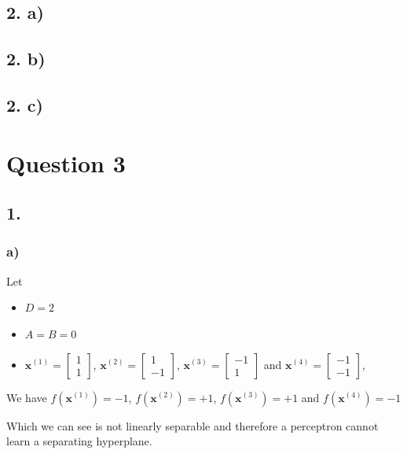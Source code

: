 \documentclass[11pt]{article}
\begin{document}
\subsection{2. a)}
\subsection{2. b)}
\subsection{2. c)}
\pagebreak
\section{Question 3}
\subsection{1.}
\subsubsection{a)}
Let
\begin{itemize}
  \item $D = 2$
  \item $A = B = 0$
  \item $\bm{x}^{(1)} = \begin{bmatrix} 1 \\ 1\end{bmatrix}$, $\bm{x}^{(2)} = \begin{bmatrix} 1 \\ -1\end{bmatrix}$, $\bm{x}^{(3)} = \begin{bmatrix} -1 \\ 1\end{bmatrix}$ and $\bm{x}^{(4)} = \begin{bmatrix} -1 \\ -1\end{bmatrix}$, 
  \end{itemize}
  We have $f ( \bm{x}^{(1)}) = -1$, $f ( \bm{x}^{(2)}) = +1$, $f ( \bm{x}^{(3)}) = +1$ and $f ( \bm{x}^{(4)}) = -1$

  \begin{figure}[h!]
  \end{figure}
  Which we can see is not linearly separable and therefore a perceptron cannot learn a separating hyperplane.
\pagebreak
\end{document}
